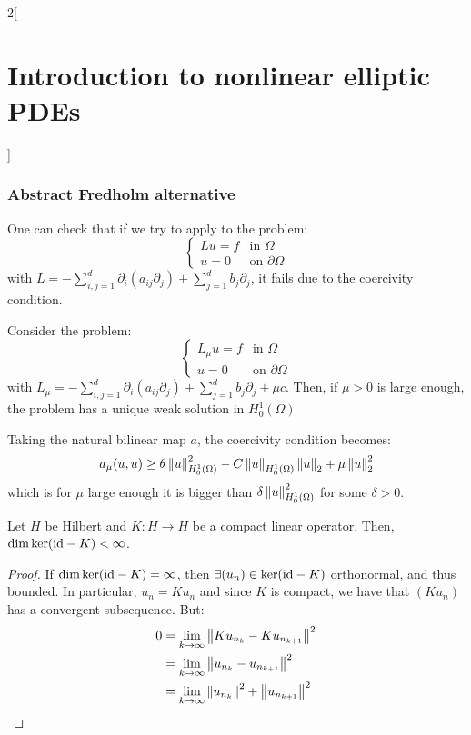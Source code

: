 \documentclass[../../../main_math.tex]{subfiles}
\begin{document}
\begin{multicols}{2}[\section{Introduction to nonlinear elliptic PDEs}]
  \subsubsection{Abstract Fredholm alternative}
  \begin{remark}
    One can check that if we try to apply  to the problem:
    $$
      \begin{cases}
        Lu=f & \text{in }\Omega         \\
        u=0  & \text{on }\partial\Omega
      \end{cases}
    $$
    with $L=-\sum_{i,j=1}^d\partial_i(a_{ij}\partial_j)+\sum_{j=1}^db_j\partial_j$, it fails due to the coercivity condition.
  \end{remark}
  \begin{proposition}
    Consider the problem:
    $$
      \begin{cases}
        L_\mu u=f & \text{in }\Omega         \\
        u=0       & \text{on }\partial\Omega
      \end{cases}
    $$
    with $L_\mu=-\sum_{i,j=1}^d\partial_i(a_{ij}\partial_j)+\sum_{j=1}^db_j\partial_j+\mu c$. Then, if $\mu>0$ is large enough, the problem has a unique weak solution in $H_0^1(\Omega)$
  \end{proposition}
  \begin{sproof}
    Taking the natural bilinear map $a$, the coercivity condition becomes:
    $$
      a_\mu(u,u)\geq \theta \left\|u\right\|_{H_0^1(\Omega)}^2-C\left\|u\right\|_{H_0^1(\Omega)}\left\|u\right\|_2 + \mu \left\|u\right\|_2^2
    $$
    which is for $\mu$ large enough it is bigger than $\delta \left\|u\right\|_{H_0^1(\Omega)}^2$ for some $\delta>0$.
  \end{sproof}
  \begin{lemma}\label{INEPDE:lemma1_fredholm}
    Let $H$ be Hilbert and $K:H\to H$ be a compact linear operator. Then, $\dim \ker(\mathrm{id}-K)<\infty$.
  \end{lemma}
  \begin{proof}
    If $\dim\ker(\mathrm{id}-K)=\infty$, then $\exists (u_n)\in \ker(\mathrm{id}-K)$ orthonormal, and thus bounded. In particular, $u_n=Ku_n$ and since $K$ is compact, we have that $(Ku_n)$ has a convergent subsequence. But:
    \begin{align*}
      0 & =\lim_{k\to\infty}\norm{Ku_{n_k}-Ku_{n_{k+1}}}^2        \\
        & =\lim_{k\to\infty}\norm{u_{n_k}-u_{n_{k+1}}}^2          \\
        & =\lim_{k\to\infty}\norm{u_{n_k}}^2+\norm{u_{n_{k+1}}}^2 \\

\end{align*}
\end{proof}
\end{multicols}
\end{document}
